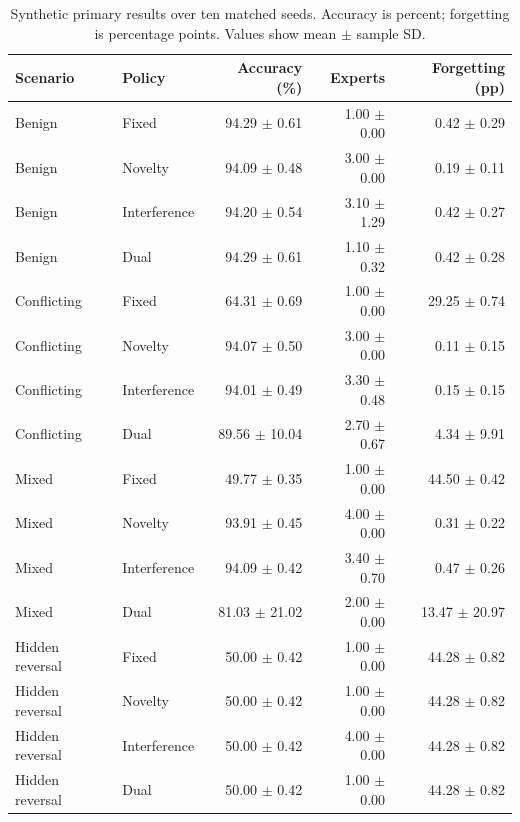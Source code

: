 \begin{table}[t]
\caption{Synthetic primary results over ten matched seeds. Accuracy is percent; forgetting is percentage points. Values show mean $\pm$ sample SD.}
\label{tab:synthetic}
\centering\small
\begin{tabular}{llrrr}\toprule Scenario & Policy & Accuracy (\%) & Experts & Forgetting (pp)\\\midrule
Benign & Fixed & 94.29 $\pm$ 0.61 & 1.00 $\pm$ 0.00 & 0.42 $\pm$ 0.29 \\
Benign & Novelty & 94.09 $\pm$ 0.48 & 3.00 $\pm$ 0.00 & 0.19 $\pm$ 0.11 \\
Benign & Interference & 94.20 $\pm$ 0.54 & 3.10 $\pm$ 1.29 & 0.42 $\pm$ 0.27 \\
Benign & Dual & 94.29 $\pm$ 0.61 & 1.10 $\pm$ 0.32 & 0.42 $\pm$ 0.28 \\
\midrule
Conflicting & Fixed & 64.31 $\pm$ 0.69 & 1.00 $\pm$ 0.00 & 29.25 $\pm$ 0.74 \\
Conflicting & Novelty & 94.07 $\pm$ 0.50 & 3.00 $\pm$ 0.00 & 0.11 $\pm$ 0.15 \\
Conflicting & Interference & 94.01 $\pm$ 0.49 & 3.30 $\pm$ 0.48 & 0.15 $\pm$ 0.15 \\
Conflicting & Dual & 89.56 $\pm$ 10.04 & 2.70 $\pm$ 0.67 & 4.34 $\pm$ 9.91 \\
\midrule
Mixed & Fixed & 49.77 $\pm$ 0.35 & 1.00 $\pm$ 0.00 & 44.50 $\pm$ 0.42 \\
Mixed & Novelty & 93.91 $\pm$ 0.45 & 4.00 $\pm$ 0.00 & 0.31 $\pm$ 0.22 \\
Mixed & Interference & 94.09 $\pm$ 0.42 & 3.40 $\pm$ 0.70 & 0.47 $\pm$ 0.26 \\
Mixed & Dual & 81.03 $\pm$ 21.02 & 2.00 $\pm$ 0.00 & 13.47 $\pm$ 20.97 \\
\midrule
Hidden reversal & Fixed & 50.00 $\pm$ 0.42 & 1.00 $\pm$ 0.00 & 44.28 $\pm$ 0.82 \\
Hidden reversal & Novelty & 50.00 $\pm$ 0.42 & 1.00 $\pm$ 0.00 & 44.28 $\pm$ 0.82 \\
Hidden reversal & Interference & 50.00 $\pm$ 0.42 & 4.00 $\pm$ 0.00 & 44.28 $\pm$ 0.82 \\
Hidden reversal & Dual & 50.00 $\pm$ 0.42 & 1.00 $\pm$ 0.00 & 44.28 $\pm$ 0.82 \\
\bottomrule
\end{tabular}
\end{table}
